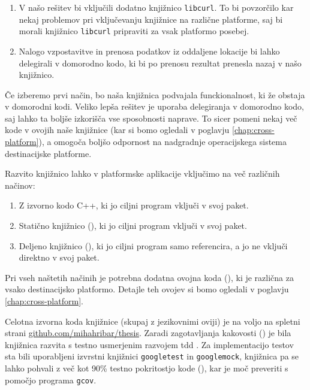 \begin{enumerate}
  \item V našo rešitev bi vključili dodatno knjižnico \texttt{libcurl}. To bi povzorčilo kar nekaj problemov pri vključevanju knjižnice na različne platforme, saj bi morali knjižnico \texttt{libcurl} pripraviti za vsak platformo posebej.
  \item Nalogo vzpostavitve in prenosa podatkov iz oddaljene lokacije bi lahko delegirali v domorodno kodo, ki bi po prenosu rezultat prenesla nazaj v našo knjižnico.
\end{enumerate}

Če izberemo prvi način, bo naša knjižnica podvajala funckionalnost, ki že obstaja v domorodni kodi. Veliko lepša rešitev je uporaba delegiranja v domorodno kodo, saj lahko ta boljše izkorišča vse sposobnosti naprave. To sicer pomeni nekaj več kode v ovojih naše knjižnice (kar si bomo ogledali v poglavju \ref{chap:cross-platform}), a omogoča boljšo odpornost na nadgradnje operacijskega sistema destinacijske platforme.

Razvito knjižnico lahko v platformske aplikacije vključimo na več različnih načinov:

\begin{enumerate}
  \item Z izvorno kodo C++, ki jo ciljni program vključi v svoj paket.
  \item Statično knjižnico (), ki jo ciljni program vključi v svoj paket.
  \item Deljeno knjižnico (), ki jo ciljni program samo referencira, a jo ne vključi direktno v svoj paket.
\end{enumerate}

Pri vseh naštetih načinih je potrebna dodatna ovojna koda (), ki je različna za vsako destinacijsko platformo. Detajle teh ovojev si bomo ogledali v poglavju \ref{chap:cross-platform}.

Celotna izvorna koda knjižnice (skupaj z jezikovnimi oviji) je na voljo na spletni strani \href{https://github.com/mihahribar/thesis}{github.com/mihahribar/thesis}. Zaradi zagotavljanja kakovosti () je bila knjižnica razvita s testno usmerjenim razvojem \gls{tdd} \cite{tdd-cpp}. Za implementacijo testov sta bili uporabljeni izvrstni knjižnici \texttt{googletest}\cite{googletest} in \texttt{googlemock}\cite{googlemock}, knjižnica pa se lahko pohvali z več kot 90\% testno pokritostjo kode (), kar je moč preveriti s pomočjo programa \texttt{gcov}.

